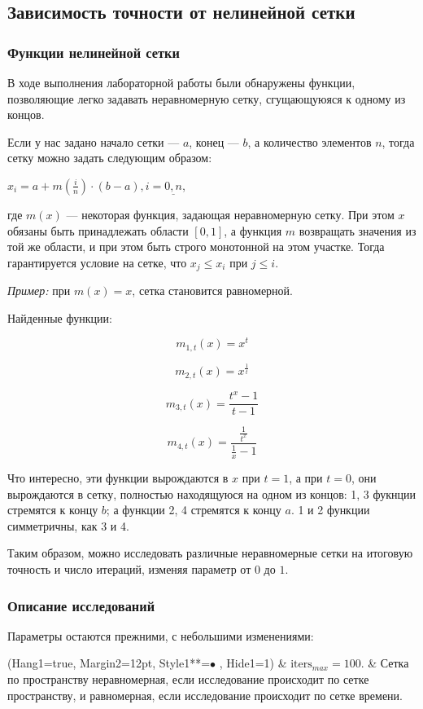 \subsection{Зависимость точности от нелинейной сетки}

\subsubsection{Функции нелинейной сетки}

В ходе выполнения лабораторной работы были обнаружены функции, позволяющие легко задавать неравномерную сетку, сгущающуюяся к одному из концов.

Если у нас задано начало сетки --- $a$, конец --- $b$, а количество элементов $n$, тогда сетку можно задать следующим образом:

$ x_i = a + m\left(\frac{i}{n}\right) \cdot (b-a), i=\underline{0, n}$, 

где $m(x)$ --- некоторая функция, задающая неравномерную сетку. При этом $x$ обязаны быть принадлежать области $[0, 1]$, а функция $m$ возвращать значения из той же области, и при этом быть строго монотонной на этом участке. Тогда гарантируется условие на сетке, что $x_j \leqslant x_i$ при $j \leqslant i$. 

\textit{Пример:} при $m(x) = x$, сетка становится равномерной.

Найденные функции:

$$ m_{1, t}(x) = x^t $$

$$ m_{2, t}(x) = x^\frac{1}{t} $$

$$ m_{3, t}(x) = \frac{t^x-1}{t-1} $$

$$ m_{4, t}(x) = \frac{\frac{1}{t^x}}{\frac{1}{x}-1} $$

Что интересно, эти функции вырождаются в $x$ при $t=1$, а при $t=0$, они вырождаются в сетку, полностью находящуюся на одном из концов: 1, 3 фукнции стремятся к концу $b$; а функции 2, 4 стремятся к концу $a$. 1 и 2 функции симметричны, как 3 и 4.

Таким образом, можно исследовать различные неравномерные сетки на итоговую точность и число итераций, изменяя параметр от $0$ до $1$.

\subsubsection{Описание исследований}

Параметры остаются прежними, с небольшими изменениями:

\noindent\begin{easylist}
\ListProperties(Hang1=true, Margin2=12pt, Style1**=$\bullet$ , Hide1=1)
& $\mathrm{iters}_{max} = 100$.
& Сетка по пространству неравномерная, если исследование происходит по сетке пространству, и равномерная, если исследование происходит по сетке времени.
\end{easylist}

